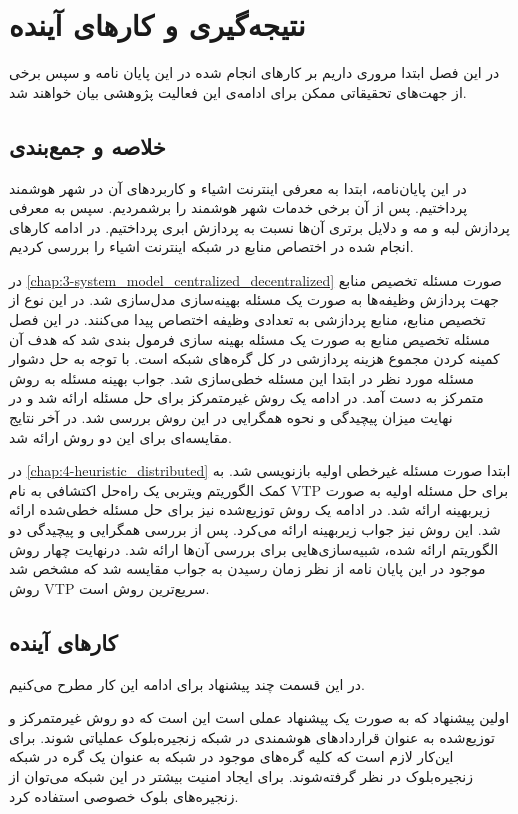 \chapter{نتیجه‌گیری و کار‌های آینده}\label{chap:conclusion}
  \thispagestyle{empty}
  در این فصل ابتدا مروری داریم بر کار‌های انجام شده در این پایان نامه و سپس برخی از جهت‌های تحقیقاتی ممکن برای ادامه‌ی این فعالیت پژوهشی بیان خواهند شد.

  \section{خلاصه و جمع‌بندی}
    در این پایان‌نامه، ابتدا به معرفی اینترنت اشیاء و کاربرد‌های آن در شهر هوشمند پرداختیم.
    پس از آن برخی خدمات شهر هوشمند را برشمردیم.
    سپس به معرفی پردازش لبه و مه و دلایل برتری آن‌ها نسبت به پردازش ابری پرداختیم.
    در ادامه کار‌های انجام شده در اختصاص منابع در شبکه اینترنت اشیاء را بررسی کردیم.

    در \cref{chap:3-system_model_centralized_decentralized} صورت مسئله تخصیص منابع جهت پردازش وظیفه‌ها به صورت یک مسئله بهینه‌سازی مدل‌سازی شد. 
    در این نوع از تخصیص منابع، منابع پردازشی به تعدادی وظیفه اختصاص پیدا می‌کنند.
    در این فصل مسئله تخصیص منابع به صورت یک مسئله بهینه سازی فرمول بندی شد که هدف آن کمینه کردن مجموع هزینه پردازشی در کل گره‌های شبکه است.
    با توجه به حل دشوار مسئله مورد نظر در ابتدا این مسئله خطی‌سازی شد. جواب بهینه مسئله به روش متمرکز به دست آمد.
    در ادامه یک روش غیرمتمرکز برای حل مسئله ارائه شد و در نهایت میزان پیچیدگی و نحوه همگرایی در این روش بررسی شد. در آخر نتایج مقایسه‌ای برای این دو روش ارائه شد.

    در \cref{chap:4-heuristic_distributed} ابتدا صورت مسئله غیرخطی اولیه بازنویسی شد.
    به کمک الگوریتم ویتربی یک راه‌حل اکتشافی به نام VTP برای حل مسئله اولیه به صورت زیر‌بهینه ارائه شد.
	در ادامه یک روش توزیع‌شده نیز برای حل مسئله خطی‌‌شده ارائه شد. این روش نیز جواب زیربهینه ارائه می‌کرد. 
    پس از بررسی همگرایی و پیچیدگی دو الگوریتم ارائه شده، شبیه‌سازی‌هایی برای بررسی آن‌ها ارائه شد.
    درنهایت چهار روش موجود در این پایان نامه از نظر زمان رسیدن به جواب مقایسه شد که مشخص شد روش VTP سریع‌ترین روش است. 

  \section{کار‌های آینده}
    در این قسمت چند پیشنهاد برای ادامه این کار مطرح می‌کنیم.
  
  اولین پیشنهاد که به صورت یک پیشنهاد عملی است این است که دو روش غیرمتمرکز و توزیع‌شده به عنوان قراردادهای هوشمندی در شبکه زنجیره‌‌بلوک عملیاتی شوند. برای این‌کار لازم است که کلیه گره‌های موجود در شبکه به عنوان یک گره در شبکه زنجیره‌بلوک در نظر گرفته‌شوند. برای ایجاد امنیت بیشتر در این شبکه می‌توان از زنجیره‌های بلوک خصوصی استفاده کرد.
  
